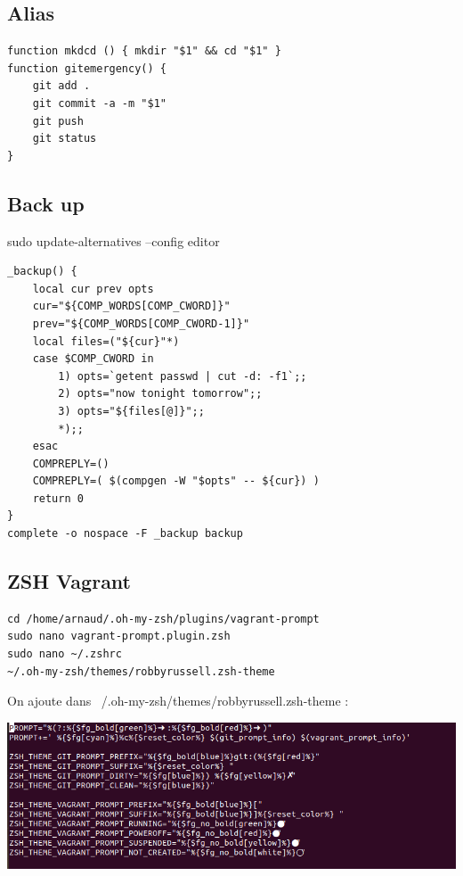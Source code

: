 \documentclass{article}
\begin{document}
\subsection{Alias} %


\begin{commandline}
	\begin{verbatim}
function mkdcd () { mkdir "$1" && cd "$1" }
function gitemergency() {
	git add .
	git commit -a -m "$1"
	git push
	git status
}
	 \end{verbatim}
\end{commandline}

\subsection{Back up} %
\noindent sudo update-alternatives --config editor \\

\begin{commandline}
	\begin{verbatim}
_backup() {
    local cur prev opts
    cur="${COMP_WORDS[COMP_CWORD]}"
    prev="${COMP_WORDS[COMP_CWORD-1]}"
    local files=("${cur}"*)
    case $COMP_CWORD in
        1) opts=`getent passwd | cut -d: -f1`;;
        2) opts="now tonight tomorrow";;
        3) opts="${files[@]}";;
        *);;
    esac
    COMPREPLY=()
    COMPREPLY=( $(compgen -W "$opts" -- ${cur}) )
    return 0
}
complete -o nospace -F _backup backup
	 \end{verbatim}
\end{commandline}

\subsection{ZSH Vagrant} %

\begin{commandline}
	\begin{verbatim}
cd /home/arnaud/.oh-my-zsh/plugins/vagrant-prompt  
sudo nano vagrant-prompt.plugin.zsh
sudo nano ~/.zshrc
~/.oh-my-zsh/themes/robbyrussell.zsh-theme
	 \end{verbatim}
\end{commandline}
On ajoute dans ~/.oh-my-zsh/themes/robbyrussell.zsh-theme :

\begin{center}
\includegraphics[]{image/zsh.png}
\end{center}
\end{document}
